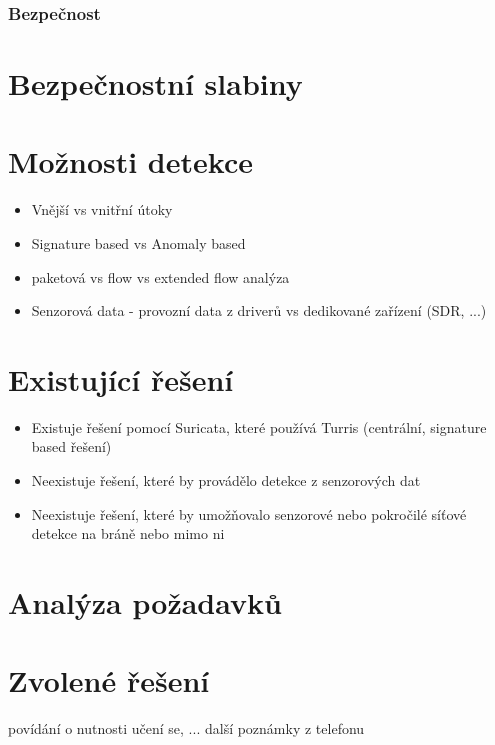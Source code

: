    \subsubsection{Bezpečnost}
  \section{Bezpečnostní slabiny}
 \section{Možnosti detekce}
 \begin{itemize}
 \item Vnější vs vnitřní útoky
 \item Signature based vs Anomaly based
 \item paketová vs flow vs extended flow analýza
 \item Senzorová data - provozní data z driverů vs dedikované zařízení (SDR, ...)
\end{itemize}



 \section{Existující řešení}
  \begin{itemize}
 \item Existuje řešení pomocí Suricata, které používá Turris (centrální, signature
 based řešení)
 \item Neexistuje řešení, které by provádělo detekce z senzorových dat
 \item Neexistuje řešení, které by umožňovalo senzorové nebo pokročilé síťové
 detekce na bráně nebo mimo ni
\end{itemize}
 \section{Analýza požadavků}
 \section{Zvolené řešení}
 povídání o nutnosti učení se, ... další poznámky z telefonu
